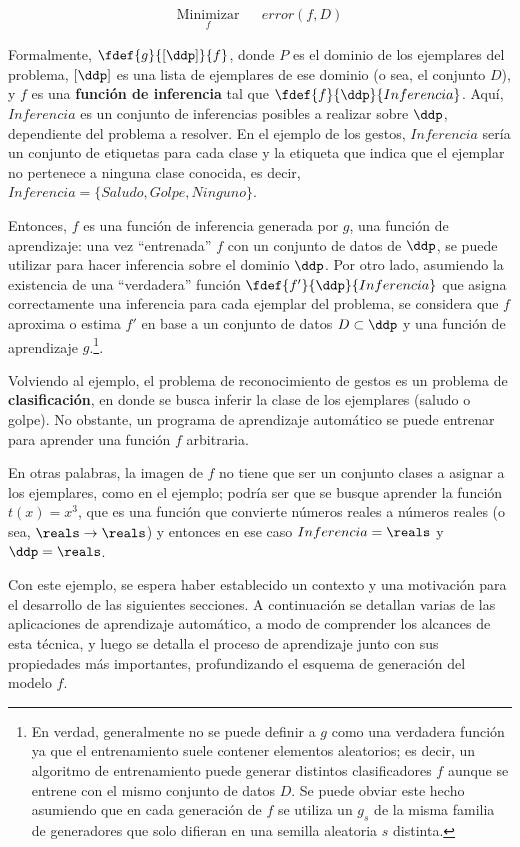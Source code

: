 \begin{equation*}
\begin{aligned}
\underset{f}{\text{Minimizar}} & & error(f,D) 
\end{aligned}
\end{equation*}

Formalmente, $\fdef{g}{[\ddp]}{f}$, donde $P$ es el dominio de los ejemplares del problema, $[\ddp]$ es una lista de ejemplares de ese dominio (o sea, el conjunto $D$), y $f$ es una \textbf{función de inferencia} tal que $\fdef{f}{\ddp}{Inferencia}$. Aquí, $Inferencia$ es un conjunto de inferencias posibles a realizar sobre $\ddp$, dependiente del problema a resolver. En el ejemplo de los gestos, $Inferencia$ sería un conjunto de etiquetas para cada clase y la etiqueta que indica que el ejemplar no pertenece a ninguna clase conocida, es decir, $Inferencia=\{ Saludo, Golpe, Ninguno \}$. 

Entonces, $f$ es una función de inferencia generada por $g$, una función de aprendizaje:  una vez ``entrenada'' $f$ con un conjunto de datos de $\ddp$, se puede utilizar para hacer inferencia sobre el dominio $\ddp$. Por otro lado, asumiendo la existencia de una ``verdadera'' función $\fdef{f'}{\ddp}{Inferencia}$ que asigna correctamente una inferencia para cada ejemplar del problema, se considera que $f$ aproxima o estima $f'$ en base a un conjunto de datos $D \subset \ddp$ y una función de aprendizaje $g$.\footnote{En verdad, generalmente no se puede definir a $g$ como una verdadera función ya que el entrenamiento suele contener elementos aleatorios; es decir, un algoritmo de entrenamiento puede generar distintos clasificadores $f$ aunque se entrene con el mismo conjunto de datos $D$. Se puede obviar este hecho asumiendo que en cada generación de $f$ se utiliza un $g_s$ de la misma familia de generadores que solo difieran en una semilla aleatoria $s$ distinta.}.

Volviendo al ejemplo, el problema de reconocimiento de gestos es un problema de \textbf{clasificación}, en donde se busca inferir la clase de los ejemplares (saludo o golpe). No obstante, un programa de aprendizaje automático se puede entrenar para aprender una función $f$ arbitraria. 

En otras palabras, la imagen de $f$ no tiene que ser un conjunto clases a asignar a los ejemplares, como en el ejemplo; podría ser que se busque aprender la función $t(x)=x^3$, que es una función que convierte números reales a números reales (o sea, $\reals \rightarrow \reals$) y entonces en ese caso $Inferencia=\reals$ y $\ddp=\reals$. 


Con este ejemplo, se espera haber establecido un contexto y una motivación para el desarrollo de las siguientes secciones. A continuación se detallan varias de las aplicaciones de aprendizaje automático, a modo de comprender los alcances de esta técnica, y luego se detalla el proceso de aprendizaje junto con sus propiedades más importantes, profundizando el esquema de generación del modelo $f$.

